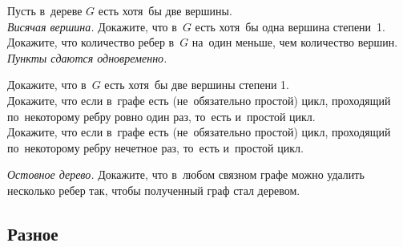 \begin{problems}

\item
Пусть в~дереве $G$ есть хотя~бы две вершины.
\\
\sp\emph{Висячая вершина.}
Докажите, что в~$G$ есть хотя~бы одна вершина степени~1.
\\
\sp
Докажите, что количество ребер в~$G$ на~один меньше, чем количество вершин.
\\
\emph{Пункты сдаются одновременно.}

\item
\sp
Докажите, что в~$G$ есть хотя~бы две вершины степени 1.
\\
\sp
Докажите, что если в~графе есть (не~обязательно простой) цикл, проходящий
по~некоторому ребру ровно один раз, то~есть и~простой цикл.
\\
\sp
Докажите, что если в~графе есть (не~обязательно простой) цикл, проходящий
по~некоторому ребру нечетное раз, то~есть и~простой цикл.

\item\emph{Остовное дерево.}
Докажите, что в~любом связном графе можно удалить нес\-коль\-ко ребер так,
чтобы полученный граф стал деревом.

\end{problems}

\subsection*{Разное}

